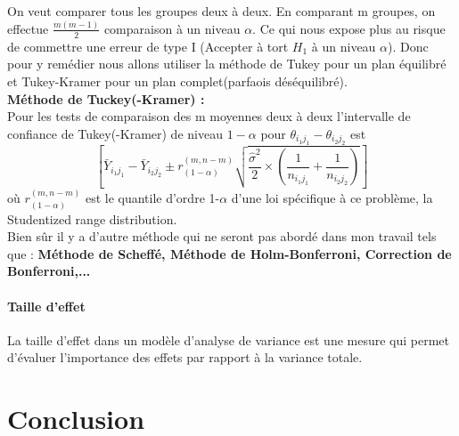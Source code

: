 \documentclass[12pt,a4paper]{report}
\begin{document}
		On veut comparer tous les groupes deux à deux. En comparant m groupes, on effectue $\frac{m(m-1)}{2}$ comparaison à un niveau $\alpha$. Ce qui nous expose plus au risque de commettre une erreur de type I (Accepter à tort $H_1$ à un niveau $\alpha$). Donc pour y remédier nous allons utiliser la méthode de Tukey pour un plan équilibré et Tukey-Kramer pour un plan complet(parfaois déséquilibré).\\
		
		\textbf{Méthode de Tuckey(-Kramer) : }\\
		Pour les tests de comparaison des m moyennes deux à deux l'intervalle de confiance de Tukey(-Kramer) de niveau $1-\alpha$ pour $\theta_{i_1j_1} - \theta_{i_2j_2}$ est 
		\begin{equation}
			\left [\bar{Y}_{i_1j_1}-\bar{Y}_{i_2j_2} \pm r^{(m,n-m)}_{(1-\alpha)}\sqrt{\frac{\hat{\sigma}^2}{2}\times(\frac{1}{n_{i_1j_1}}+\frac{1}{n_{i_2j_2}})}\right]
		\end{equation}
		où $r^{(m,n-m)}_{(1-\alpha)}$ est le quantile d'ordre 1-$\alpha$ d'une loi spécifique à ce problème, la Studentized range distribution.\\
		Bien sûr il y a d'autre méthode qui ne seront pas abordé dans mon travail tels que : \textbf{Méthode de Scheffé, Méthode de Holm-Bonferroni, Correction de Bonferroni,...}
		
	\subsubsection{Taille d'effet}
	La taille d'effet dans un modèle d'analyse de variance est une mesure qui permet d'évaluer l'importance des effets par rapport à la variance totale.
	\chapter{Conclusion}
	
\end{document}

